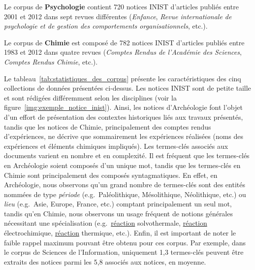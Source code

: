   Le corpus de \textbf{Psychologie} contient 720 notices INIST d'articles
  publiés entre 2001 et 2012 dans sept revues différentes
  (\textit{Enfance}, \textit{Revue internationale de psychologie et de gestion
  des comportements organisationnels}, etc.).

  Le corpus de \textbf{Chimie} est composé de 782 notices INIST d'articles
  publiés entre 1983 et 2012 dans quatre revues (\textit{Comptes Rendus de
  l'Académie des Sciences}, \textit{Comptes Rendus Chimie}, etc.).

  Le tableau~\ref{tab:statistiques_des_corpus} présente les caractéristiques des
  cinq collections de données présentées ci-dessus.
  Les notices INIST sont de petite taille et sont rédigées différemment selon
  les disciplines (voir la figure~\ref{img:exemple_notice_inist}). Ainsi, les
  notices d'Archéologie font l'objet d'un effort de présentation des contextes
  historiques liés aux travaux présentés, tandis que les notices de Chimie,
  principalement des comptes rendus d'expériences, ne décrive que sommairement
  les expériences réalisées (noms des expériences et éléments chimiques
  impliqués). Les termes-clés associés aux documents varient en nombre et en
  complexité. Il est fréquent que les termes-clés en Archéologie soient composés
  d'un unique mot, tandis que les termes-clés en Chimie sont principalement des
  composés syntagmatiques. En effet, en Archéologie, nous observons qu'un grand
  nombre de termes-clés sont des entités nommées de type \textit{période}
  (e.g.~\og{}Paléolithique\fg{}, \og{}Mésolithique\fg{}, \og{}Néolithique\fg{},
  etc.) ou \textit{lieu} (e.g.~\og{}Asie\fg{}, \og{}Europe\fg{},
  \og{}France\fg{}, etc.) comptant principalement un seul mot, tandis qu'en
  Chimie, nous observons un usage fréquent de notions générales nécessitant une
  spécialisation (e.g.~\og{}\underline{réaction} solvothermale\fg{},
  \og{}\underline{réaction} électrochimique\fg{}, \og{}\underline{réaction}
  thermique\fg{}, etc.). Enfin, il est important de noter le faible rappel
  maximum pouvant être obtenu pour ces corpus. Par exemple, dans le corpus de
  Sciences de l'Information, uniquement 1,3 termes-clés peuvent être extraits
  des notices parmi les 5,8 associés aux notices, en moyenne.
